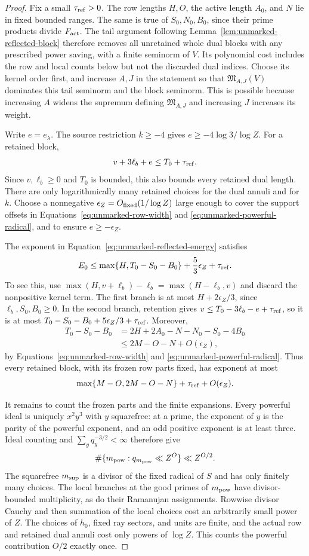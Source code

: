\documentclass[11pt,a4paper]{article}
\numberwithin{equation}{section}
\numberwithin{figure}{section}
\theoremstyle{definition}
\theoremstyle{remark}
\begin{document}
\begin{proof}
Fix a small $\tau_{\rm ref}>0$.  The row lengths $H,O$, the active length
$A_0$, and $N$ lie in fixed bounded ranges.  The same is true of
$S_0,N_0,B_0$, since their prime products divide $F_{\rm act}$.  The tail
argument following Lemma~\ref{lem:unmarked-reflected-block} therefore removes
all unretained whole dual blocks with any prescribed power saving, with a
finite seminorm of $V$.  Its polynomial cost includes the row and local
counts below but not the discarded dual indices.  Choose its kernel order
first, and increase $A,J$ in the statement so that
$\mathfrak M_{A,J}(V)$ dominates this tail seminorm and the block seminorm.
This is possible because increasing $A$ widens the supremum defining
$\mathfrak M_{A,J}$ and increasing $J$ increases its weight.

Write $e=e_\lambda$.  The source restriction $k\ge-4$ gives
$e\ge-4\log 3/\log Z$.  For a retained block,
\[
 v+3\ell_b+e\le T_0+\tau_{\rm ref}.
\]
Since $v,\ell_b\ge0$ and $T_0$ is bounded, this also bounds every retained
dual length.  There are only logarithmically many retained choices for the
dual annuli and for $k$.  Choose a nonnegative
$\epsilon_Z=O_{\rm fixed}(1/\log Z)$ large enough to cover the support
offsets in Equations~\eqref{eq:unmarked-row-width} and
\eqref{eq:unmarked-powerful-radical}, and to ensure $e\ge-\epsilon_Z$.

The exponent in Equation~\eqref{eq:unmarked-reflected-energy} satisfies
\[
 E_0\le\max\{H,T_0-S_0-B_0\}+\frac53\epsilon_Z+\tau_{\rm ref}.
\]
To see this, use $\max(H,v+\ell_b)-\ell_b=\max(H-\ell_b,v)$ and discard
the nonpositive kernel term.  The first branch is at most
$H+2\epsilon_Z/3$, since $\ell_b,S_0,B_0\ge0$.  In the second branch,
retention gives $v\le T_0-3\ell_b-e+\tau_{\rm ref}$, so it is at most
$T_0-S_0-B_0+5\epsilon_Z/3+\tau_{\rm ref}$.  Moreover,
\[
 \begin{split}
 T_0-S_0-B_0
 &=2H+2A_0-N-N_0-S_0-4B_0\\
 &\le 2M-O-N+O(\epsilon_Z),
 \end{split}
\]
by Equations~\eqref{eq:unmarked-row-width} and
\eqref{eq:unmarked-powerful-radical}.  Thus every retained block, with its
frozen row parts fixed, has exponent at most
\[
 \max\{M-O,2M-O-N\}+\tau_{\rm ref}+O(\epsilon_Z).
\]

It remains to count the frozen parts and the finite expansions.  Every
powerful ideal is uniquely $x^2y^3$ with $y$ squarefree: at a prime, the
exponent of $y$ is the parity of the powerful exponent, and an odd positive
exponent is at least three.  Ideal counting and
$\sum_yq_y^{-3/2}<\infty$ therefore give
\[
 \#\{m_{\rm pow}:q_{m_{\rm pow}}\ll Z^O\}\ll Z^{O/2}.
\]
The squarefree $m_{\rm sup}$ is a divisor of the fixed radical of $S$ and
has only finitely many choices.  The local branches at the good primes of
$m_{\rm pow}$ have divisor-bounded multiplicity, as do their Ramanujan
assignments.  Rowwise divisor Cauchy and then summation of the local choices
cost an arbitrarily small power of $Z$.  The choices of $h_0$, fixed ray
sectors, and units are finite, and the actual row and retained dual annuli
cost only powers of $\log Z$.  This counts the powerful contribution $O/2$
exactly once.


\end{proof}
\end{document}
